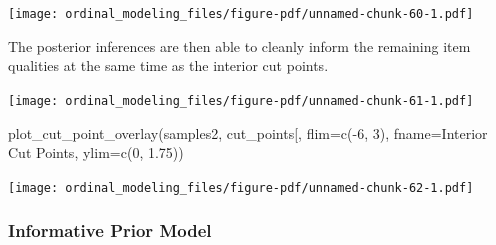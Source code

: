 \documentclass[
  letterpaper,
  DIV=11,
  numbers=noendperiod]{scrartcl}
\newenvironment{Shaded}{\begin{snugshade}}{\end{snugshade}}
\newcommand{\AttributeTok}[1]{\textcolor[rgb]{0.40,0.45,0.13}{#1}}
\newcommand{\ControlFlowTok}[1]{\textcolor[rgb]{0.00,0.23,0.31}{#1}}
\newcommand{\DecValTok}[1]{\textcolor[rgb]{0.68,0.00,0.00}{#1}}
\newcommand{\FloatTok}[1]{\textcolor[rgb]{0.68,0.00,0.00}{#1}}
\newcommand{\FunctionTok}[1]{\textcolor[rgb]{0.28,0.35,0.67}{#1}}
\newcommand{\NormalTok}[1]{\textcolor[rgb]{0.00,0.23,0.31}{#1}}
\newcommand{\OtherTok}[1]{\textcolor[rgb]{0.00,0.23,0.31}{#1}}
\newcommand{\SpecialCharTok}[1]{\textcolor[rgb]{0.37,0.37,0.37}{#1}}
\newcommand{\StringTok}[1]{\textcolor[rgb]{0.13,0.47,0.30}{#1}}
\begin{document}
\texttt{[image: ordinal\_modeling\_files/figure-pdf/unnamed-chunk-60-1.pdf]}

The posterior inferences are then able to cleanly inform the remaining
item qualities at the same time as the interior cut points.

\begin{Shaded}
\end{Shaded}

\texttt{[image: ordinal\_modeling\_files/figure-pdf/unnamed-chunk-61-1.pdf]}

\begin{Shaded}
\begin{Highlighting}[]
\FunctionTok{plot\_cut\_point\_overlay}\NormalTok{(samples2, }\StringTok{\textquotesingle{}cut\_points[\textquotesingle{}}\NormalTok{,}
                       \AttributeTok{flim=}\FunctionTok{c}\NormalTok{(}\SpecialCharTok{{-}}\DecValTok{6}\NormalTok{, }\DecValTok{3}\NormalTok{), }\AttributeTok{fname=}\StringTok{\textquotesingle{}Interior Cut Points\textquotesingle{}}\NormalTok{,}
                       \AttributeTok{ylim=}\FunctionTok{c}\NormalTok{(}\DecValTok{0}\NormalTok{, }\FloatTok{1.75}\NormalTok{))}
\end{Highlighting}
\end{Shaded}

\texttt{[image: ordinal\_modeling\_files/figure-pdf/unnamed-chunk-62-1.pdf]}

\subsubsection{Informative Prior Model}\label{informative-prior-model}
\end{document}
